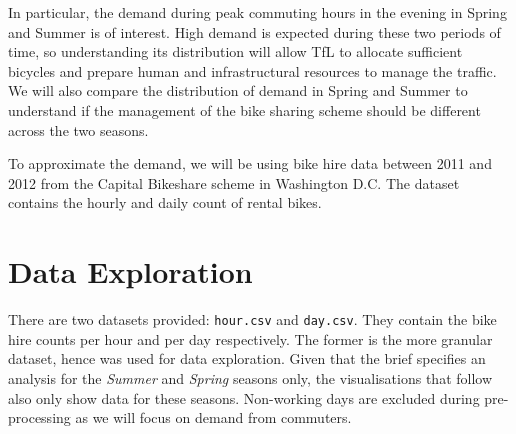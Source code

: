 In particular, the demand during peak commuting hours in the evening in Spring and Summer is of interest. High demand is expected during these two periods of time, so understanding its distribution will allow TfL to allocate sufficient bicycles and prepare human and infrastructural resources to manage the traffic. We will also compare the distribution of demand in Spring and Summer to understand if the management of the bike sharing scheme should be different across the two seasons.

To approximate the demand, we will be using bike hire data between 2011 and 2012 from the Capital Bikeshare scheme in Washington D.C. \cite{data} The dataset contains the hourly and daily count of rental bikes.



\section{Data Exploration}
There are two datasets provided: \texttt{hour.csv} and \texttt{day.csv}. They contain the bike hire counts per hour and per day respectively. The former is the more granular dataset, hence was used for data exploration. Given that the brief specifies an analysis for the \textit{Summer} and \textit{Spring} seasons only, the visualisations that follow also only show data for these seasons. Non-working days are excluded during pre-processing as we will focus on demand from commuters.

\begin{comment}
The figure below shows the total bike rental by hour for the \textit{Spring} season across \textit{workingday} on the vertical axis and split by \textit{year}

\texttt{[image: images/image4.jpeg]}

The figure below shows the total bike rental by hour for the \textit{Summer} season across \textit{workingday} on the vertical axis and split by \textit{year}

\texttt{[image: images/image5.jpeg]}

From the previous two figures, there is a common general trend for both years of the data provided. Hence, for our analysis, the average of the two years will be considered in the later parts of the analysis.
\end{comment}

